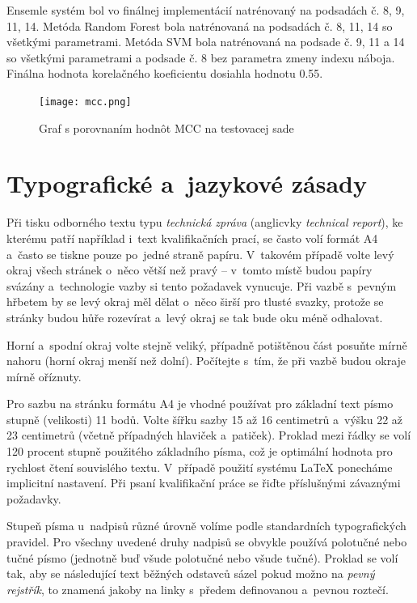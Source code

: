 Ensemle systém bol vo finálnej implementácií natrénovaný na podsadách č. 8, 9, 11, 14. Metóda Random Forest bola natrénovaná na podsadách č. 8, 11, 14 so všetkými parametrami. Metóda SVM bola natrénovaná na podsade č. 9, 11 a 14 so všetkými parametrami a podsade č. 8 bez parametra zmeny indexu náboja. Finálna hodnota korelačného koeficientu dosiahla hodnotu 0.55. 

\begin{figure}[H]
	\centering
	\begin{center}
		\scalebox{0.7}
		{   
			\texttt{[image: mcc.png]}
		}
		\caption{Graf s porovnaním hodnôt MCC na testovacej sade}
	\end{center}
\end{figure}





\chapter{Typografické a~jazykové zásady}
Při tisku odborného textu typu {\it technická zpráva} (anglicvky {\it technical report}), ke kterému patří například i~text kvalifikačních prací, se často volí formát A4 a~často se tiskne pouze po~jedné straně papíru. V~takovém případě volte levý okraj všech stránek o~něco větší než pravý -- v~tomto místě budou papíry svázány a~technologie vazby si tento požadavek vynucuje. Při vazbě s~pevným hřbetem by se levý okraj měl dělat o~něco širší pro tlusté svazky, protože se stránky budou hůře rozevírat a~levý okraj se tak bude oku méně odhalovat.

Horní a~spodní okraj volte stejně veliký, případně potištěnou část posuňte mírně nahoru (horní okraj menší než dolní). Počítejte s~tím, že při vazbě budou okraje mírně oříznuty.

Pro sazbu na stránku formátu A4 je vhodné používat pro základní text písmo stupně (velikosti) 11 bodů. Volte šířku sazby 15 až 16 centimetrů a~výšku 22 až 23 centimetrů (včetně případných hlaviček a~patiček). Proklad mezi řádky se volí 120 procent stupně použitého základního písma, což je optimální hodnota pro rychlost čtení souvislého textu. V~případě použití systému LaTeX ponecháme implicitní nastavení. Při psaní kvalifikační práce se řiďte příslušnými závaznými požadavky.

Stupeň písma u~nadpisů různé úrovně volíme podle standardních typografických pravidel. 
Pro všechny uvedené druhy nadpisů se obvykle používá polotučné nebo tučné písmo (jednotně buď všude polotučné nebo všude tučné). Proklad se volí tak, aby se následující text běžných odstavců sázel pokud možno na {\it pevný rejstřík}, to znamená jakoby na linky s~předem definovanou a~pevnou roztečí.


